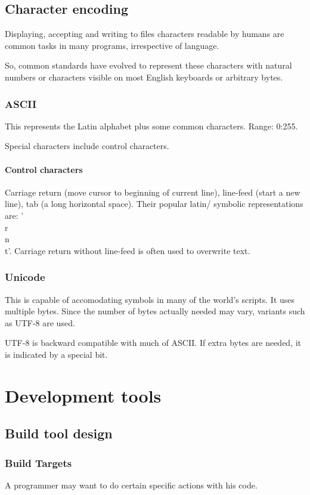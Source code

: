 \documentclass[oneside, article]{memoir}
\begin{document}
\chapter{Character encoding}
Displaying, accepting and writing to files characters readable by humans are common tasks in many programs, irrespective of language.

So, common standards have evolved to represent these characters with natural numbers or characters visible on most English keyboards or arbitrary bytes.

\section{ASCII}
This represents the Latin alphabet plus some common characters. Range: 0:255.

Special characters include control characters. 

\subsection{Control characters}
Carriage return (move cursor to beginning of current line), line-feed (start a new line), tab (a long horizontal space). Their popular latin/ symbolic representations are: '\\r\\n\\t'. Carriage return without line-feed is often used to overwrite text.

\section{Unicode}
This is capable of accomodating symbols in many of the world's scripts. It uses multiple bytes. Since the number of bytes actually needed may vary, variants such as UTF-8 are used.

UTF-8 is backward compatible with much of ASCII. If extra bytes are needed, it is indicated by a special bit.



\part{Development tools}
\chapter{Build tool design}
\section{Build Targets}
A programmer may want to do certain specific actions with his code.
\end{document}

